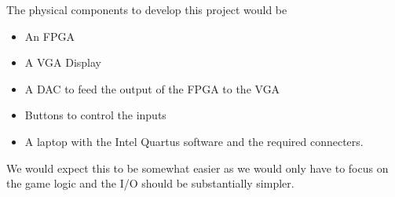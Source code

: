 The physical components to develop this project would be 
\begin{itemize}
    \item An FPGA
    \item A VGA Display
    \item A DAC to feed the output of the FPGA to the VGA
    \item Buttons to control the inputs 
    \item A laptop with the Intel Quartus software and the required connecters. 
\end{itemize}
We would expect this to be somewhat easier as we would only have to focus on the game logic and the I/O should
 be substantially simpler. 